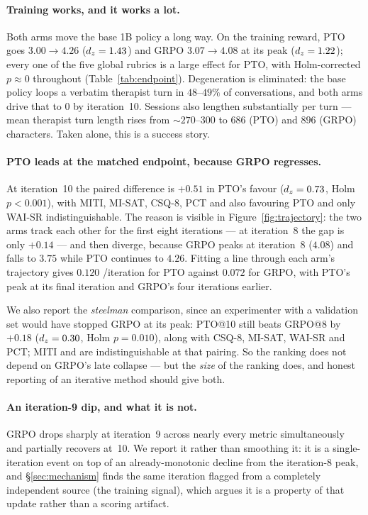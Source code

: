 \paragraph{Training works, and it works a lot.}
Both arms move the base 1B policy a long way. On the training reward, PTO goes
$3.00 \to 4.26$ ($d_z{}=1.43$) and GRPO $3.07 \to 4.08$ at its peak
($d_z{}=1.22$); every one of the five global rubrics is a large effect for PTO, with
Holm-corrected $p\!\approx\!0$ throughout (Table~\ref{tab:endpoint}). Degeneration is
eliminated: the base policy loops a verbatim therapist turn in $48$--$49\%$ of
conversations, and both arms drive that to $0$ by iteration~10. Sessions also lengthen
substantially per turn --- mean therapist turn length rises from ${\sim}270$--$300$ to
$686$ (PTO) and $896$ (GRPO) characters. Taken alone, this is a success story.

\paragraph{PTO leads at the matched endpoint, because GRPO regresses.}
At iteration~10 the paired difference is $+0.51$ \QQ{} in PTO's favour
($d_z{}=0.73$, Holm $p<0.001$), with MITI, MI-SAT, CSQ-8, PCT and \mici{} also favouring
PTO and only WAI-SR indistinguishable. The reason is visible in
Figure~\ref{fig:trajectory}: the two arms track each other for the first eight iterations
--- at iteration~8 the gap is only $+0.14$ --- and then diverge, because GRPO peaks at
iteration~8 ($4.08$) and falls to $3.75$ while PTO continues to $4.26$. Fitting a line
through each arm's trajectory gives $0.120$ \QQ{}/iteration for PTO against $0.072$ for
GRPO, with PTO's peak at its final iteration and GRPO's four iterations earlier.

We also report the \emph{steelman} comparison, since an experimenter with a validation set
would have stopped GRPO at its peak: PTO@10 still beats GRPO@8 by $+0.18$ \QQ{}
($d_z{}=0.30$, Holm $p=0.010$), along with CSQ-8, MI-SAT, WAI-SR and PCT; MITI and \mici{}
are indistinguishable at that pairing. So the ranking does not depend on GRPO's late
collapse --- but the \emph{size} of the ranking does, and honest reporting of an iterative
method should give both.

\paragraph{An iteration-9 dip, and what it is not.}
GRPO drops sharply at iteration~9 across nearly every metric simultaneously and partially
recovers at~10. We report it rather than smoothing it: it is a single-iteration event on
top of an already-monotonic decline from the iteration-8 peak, and \S\ref{sec:mechanism}
finds the same iteration flagged from a completely independent source (the training
signal), which argues it is a property of that update rather than a scoring artifact.

